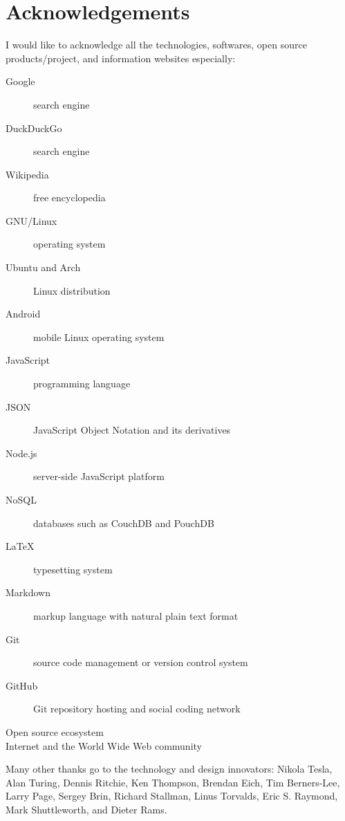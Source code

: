 
\begingroup
\let\clearpage\relax
\let\cleardoublepage\relax

\chapter{Acknowledgements}
\label{chap:acknowledgements}

I would like to acknowledge all the technologies, softwares, open source products/project, and information websites especially:

\begin{description}
  \item[Google] search engine
  \item[DuckDuckGo] search engine
  \item[Wikipedia] free encyclopedia
  \item[GNU/Linux] operating system
  \item[Ubuntu and Arch] Linux distribution
  \item[Android] mobile Linux operating system
  \item[JavaScript] programming language
  \item[JSON] JavaScript Object Notation and its derivatives
  \item[Node.js] server-side JavaScript platform
  \item[NoSQL] databases such as CouchDB and PouchDB
  \item[LaTeX] typesetting system
  \item[Markdown] markup language with natural plain text format
  \item[Git] source code management or version control system
  \item[GitHub] Git repository hosting and social coding network
  \item[Open source ecosystem]
  \item[Internet and the World Wide Web community]
\end{description}

\noindent Many other thanks go to the technology and design innovators: Nikola Tesla, Alan Turing, Dennis Ritchie, Ken Thompson, Brendan Eich, Tim Berners-Lee, Larry Page, Sergey Brin, Richard Stallman, Linus Torvalds, Eric S. Raymond, Mark Shuttleworth, and Dieter Rams.

\endgroup

